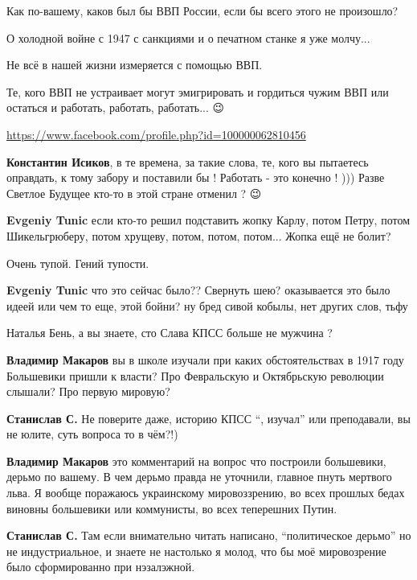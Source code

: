\begin{itemize}
\begin{itemize}
Как по-вашему, каков был бы ВВП России, если бы всего этого не произошло?

О холодной войне с 1947 с санкциями и о печатном станке я уже молчу... 🤫

Не всё в нашей жизни измеряется с помощью ВВП.

Те, кого ВВП не устраивает могут эмигрировать и гордиться чужим ВВП или
остаться и работать, работать, работать... 😉

\url{https://www.facebook.com/profile.php?id=100000062810456}

\textbf{Константин Исиков}, в те времена, за такие слова, те, кого вы пытаетесь
оправдать, к тому забору и поставили бы ! Работать - это конечно ! ))) Разве
Светлое Будущее кто-то в этой стране отменил ? 😉


\textbf{Evgeniy Tunic} если кто-то решил подставить жопку Карлу, потом Петру,
потом Шикельгрюберу, потом хрущеву, потом, потом, потом... Жопка ещё не болит?

Очень тупой. Гений тупости.

\textbf{Evgeniy Tunic} что это сейчас было?? Свернуть шею? оказывается это было идеей или
чем то еще, этой бойни? ну бред сивой кобылы, нет других слов, тьфу

Наталья Бень, а вы знаете, сто Слава КПСС больше не мужчина ?

\textbf{Владимир Макаров} вы в школе изучали при каких обстоятельствах в 1917
году Большевики пришли к власти? Про Февральскую и Октябрьскую революции
слышали? Про первую мировую?

\textbf{Станислав С.} Не поверите даже, историю КПСС \enquote{, изучал} или преподавали, вы не юлите, суть вопроса то в чём?!)

\textbf{Владимир Макаров} это комментарий на вопрос что построили большевики,
дерьмо по вашему.  В чем дерьмо правда не уточнили, главное пнуть мертвого
льва.  Я вообще поражаюсь украинскому мировоззрению, во всех прошлых бедах
виновны большевики или коммунисты,
во всех теперешних Путин.

\textbf{Станислав С.} Там если внимательно читать написано, \enquote{политическое
дерьмо} но не индустриальное, и знаете не настолько я молод, что бы моё
мировозрение было сформированно при нэзалэжной.

\end{itemize}


\end{itemize}

